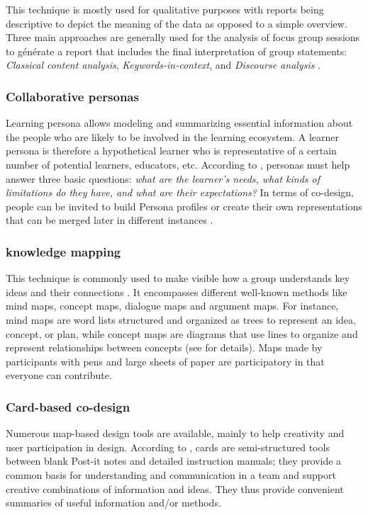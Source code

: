 \documentclass[manuscript,screen,nonacm,12pt]{acmart}
\begin{document}
This technique is mostly used for qualitative purposes with reports being descriptive to depict the meaning of the data as opposed to a simple overview. Three main approaches are generally used for the analysis of focus group sessions to générate a report that includes the final interpretation of group
statements: \textit{Classical content analysis}, \textit{Keywords-in-context}, and \textit{Discourse analysis} \cite{prieto2018co}.



\subsubsection{Collaborative personas}
Learning persona allows modeling and summarizing essential information about the people who are likely to be involved in the learning ecosystem. A learner persona is therefore a hypothetical learner who is representative of a certain number of potential learners, educators, etc.
According to \citet{zhang2016data}, personas must help answer three basic questions: \textit{what are the learner’s needs, what kinds of limitations do they have, and what are their expectations?}
In terms of co-design, people can be invited to build Persona profiles or create their own representations that can be merged later in different instances \cite{prieto2018co}.

\subsubsection{knowledge mapping}
This technique is commonly used to make visible how a group understands key ideas and their connections \cite{prieto2018co}. It encompasses different well-known methods like  mind maps, concept
maps, dialogue maps and argument maps. For instance, mind maps are word lists structured and organized as trees to represent an idea, concept, or plan, while concept maps are diagrams that use lines to organize and represent relationships between concepts \cite{carrillo2017dashboard} (see \cite{okada2008knowledge} for details). Maps made by participants with pens and large sheets of paper are participatory in that everyone can contribute.

\subsubsection{Card-based co-design}
Numerous map-based design tools are available, mainly to help creativity and user participation in design. According to \citet{roy2019card}, cards are semi-structured tools between blank Post-it notes and detailed instruction manuals; they provide a common basis for understanding and communication in a team and support creative combinations of information and ideas. They thus  provide convenient summaries of useful information and/or methods.
\end{document}
